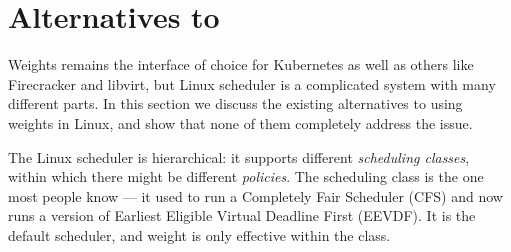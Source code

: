 \section{Alternatives to \cgroups{}}\label{s:alternatives}

Weights remains the \cgroups{} interface of choice for Kubernetes as well as
others like Firecracker and libvirt, but Linux scheduler is a complicated system
with many different parts. In this section we discuss the existing alternatives
to using \cgroups{} weights in Linux, and show that none of them completely
address the issue.

The Linux scheduler is hierarchical: it supports different \textit{scheduling
classes}, within which there might be different \textit{policies}. The
\normalclass{} scheduling class is the one most people know --- it used to run a
Completely Fair Scheduler (CFS) and now runs a version of Earliest Eligible
Virtual Deadline First (EEVDF). It is the default scheduler, and \cgroups{}
weight is only effective within the \normalclass{} class.

\subsection{\schedidle{}}

